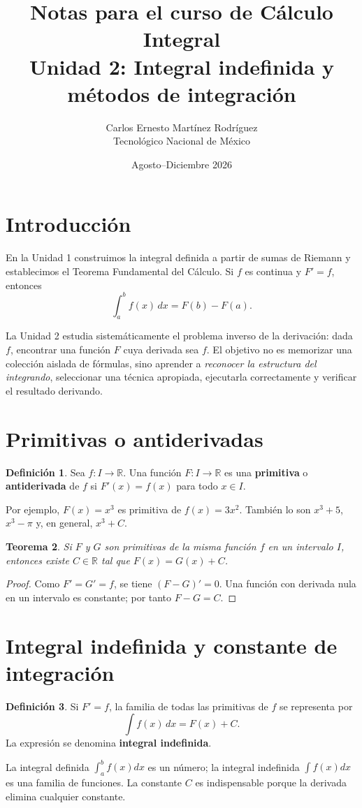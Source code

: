 \documentclass[12pt]{article}
\title{\textbf{Notas para el curso de Cálculo Integral}\\[0.3cm]\Large Unidad 2: Integral indefinida y métodos de integración}
\author{Carlos Ernesto Martínez Rodríguez\\Tecnológico Nacional de México}
\date{Agosto--Diciembre 2026}
\newtheorem{teorema}{Teorema}[section]
\theoremstyle{definition}
\newtheorem{definicion}[teorema]{Definición}
\theoremstyle{remark}
\newcommand{\R}{\mathbb{R}}
\begin{document}
\maketitle
\tableofcontents
\newpage
\section{Introducci\'on}
En la Unidad 1 construimos la integral definida a partir de sumas de Riemann y establecimos el Teorema Fundamental del Cálculo. Si $f$ es continua y $F'=f$, entonces
\[\int_a^b f(x)\,dx=F(b)-F(a).\]

La Unidad 2 estudia sistemáticamente el problema inverso de la derivación: dada $f$, encontrar una función $F$ cuya derivada sea $f$. El objetivo no es memorizar una colección aislada de fórmulas, sino aprender a \emph{reconocer la estructura del integrando}, seleccionar una técnica apropiada, ejecutarla correctamente y verificar el resultado derivando.
\section{Primitivas o antiderivadas}
\begin{definicion}Sea $f:I\to\R$. Una función $F:I\to\R$ es una \textbf{primitiva} o \textbf{antiderivada} de $f$ si $F'(x)=f(x)$ para todo $x\in I$.\end{definicion}
Por ejemplo, $F(x)=x^3$ es primitiva de $f(x)=3x^2$. También lo son $x^3+5$, $x^3-\pi$ y, en general, $x^3+C$.
\begin{teorema}Si $F$ y $G$ son primitivas de la misma función $f$ en un intervalo $I$, entonces existe $C\in\R$ tal que $F(x)=G(x)+C$.\end{teorema}
\begin{proof}Como $F'=G'=f$, se tiene $(F-G)'=0$. Una función con derivada nula en un intervalo es constante; por tanto $F-G=C$.\end{proof}

\section*{Integral indefinida y constante de integración}
\begin{definicion}Si $F'=f$, la familia de todas las primitivas de $f$ se representa por
\[\boxed{\int f(x)\,dx=F(x)+C}.\]
La expresión se denomina \textbf{integral indefinida}.\end{definicion}
La integral definida $\int_a^b f(x)dx$ es un número; la integral indefinida $\int f(x)dx$ es una familia de funciones. La constante $C$ es indispensable porque la derivada elimina cualquier constante.
\end{document}
